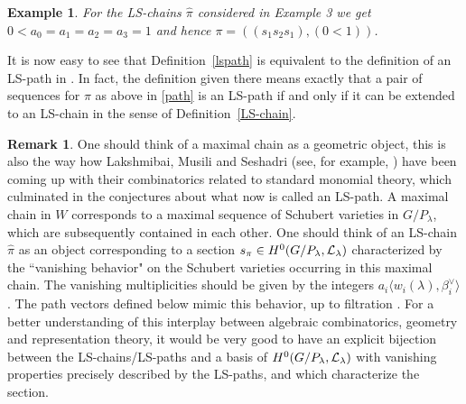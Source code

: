 \documentclass{emsprocart}
\newtheorem{exam}[theorem]{Example}
\theoremstyle{definition}
\newtheorem{remark}[theorem]{Remark}
\begin{document}
\par\noindent
\begin{exam}\rm
For the LS-chains $\hat\pi$ considered in Example 3 we get $0<a_0=a_1=a_2=a_3=1$ and hence
$\pi=((s_1s_2s_1),(0<1))$.
\end{exam}
It is now easy to see that Definition~\ref{lspath} is equivalent to the definition of an LS-path in \cite{L1}.
In fact, the definition given there means exactly that a pair of sequences for $\pi$ as above in \eqref{path} is an
LS-path if and only if it can be extended to an LS-chain in the sense of Definition~\ref{LS-chain}.

\begin{remark}
One should think of a maximal chain as a geometric object, this is also the way how Lakshmibai, Musili and Seshadri
(see, for example, \cite{LMS,LaSc1,LaSc2}) have been coming up with their combinatorics related to standard monomial theory,
which culminated in the conjectures about what now is called an LS-path. A maximal chain in $W$ corresponds to a maximal sequence of Schubert varieties in $G/P_\lambda$,
which are subsequently contained in each other. One should think of an LS-chain $\hat\pi$ as an object
corresponding to a section $s_\pi\in H^0(G/P_\lambda,\cal L_{\lambda})$ characterized by the ``vanishing behavior" on the Schubert varieties
occurring in this maximal chain. The vanishing multiplicities should be given by the integers $a_i\langle w_{i}(\lambda),\beta^\vee_i\rangle$.
The path vectors defined below mimic this behavior, up to filtration \cite{L2}.
For a better understanding of this interplay between algebraic combinatorics, geometry and representation theory,
 it would be very good to have an explicit bijection between the LS-chains/LS-paths and a basis of $H^0(G/P_\lambda,\cal L_{\lambda})$
with vanishing properties precisely described by the LS-paths, and which characterize the section.
\end{remark}
\end{document}
